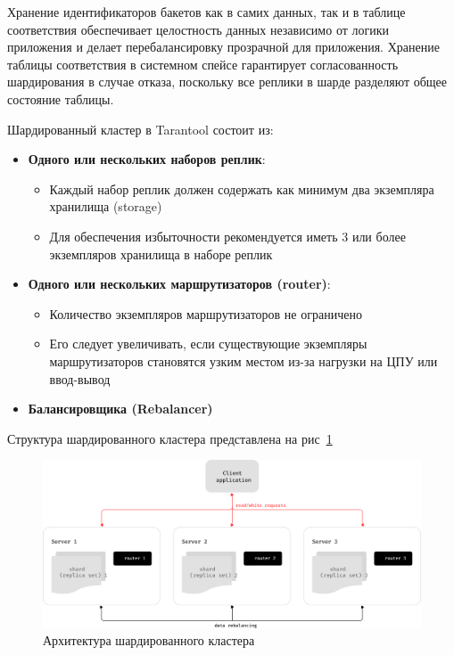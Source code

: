 Хранение идентификаторов бакетов как в самих данных, так и в таблице
соответствия обеспечивает целостность данных независимо от логики приложения и
делает перебалансировку прозрачной для приложения. Хранение таблицы
соответствия в системном спейсе гарантирует согласованность шардирования в
случае отказа, поскольку все реплики в шарде разделяют общее состояние таблицы.

Шардированный кластер в Tarantool состоит из:

\begin{itemize}
    \item \textbf{Одного или нескольких наборов реплик}:
    \begin{itemize}
        \item Каждый набор реплик должен содержать как минимум два экземпляра
              хранилища (storage)
        \item Для обеспечения избыточности рекомендуется иметь 3 или более
              экземпляров хранилища в наборе реплик
    \end{itemize}

    \item \textbf{Одного или нескольких маршрутизаторов (router)}:
    \begin{itemize}
        \item Количество экземпляров маршрутизаторов не ограничено
        \item Его следует увеличивать, если существующие экземпляры
              маршрутизаторов становятся узким местом из-за нагрузки на ЦПУ или
              ввод-вывод
    \end{itemize}
    \item \textbf{Балансировщика (Rebalancer)}
\end{itemize}

Структура шардированного кластера представлена на рис~\ref{fig:fig04}

\begin{figure}
  \centering
  \includegraphics[scale=0.5]{inc/schema.png}
  \caption{Архитектура шардированного кластера \cite{VshardDoc}}
  \label{fig:fig04}
\end{figure}

